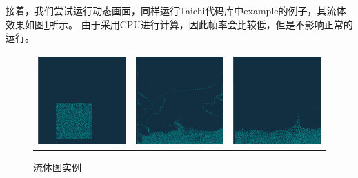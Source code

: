\documentclass[thesis]{thesis}
\begin{document}
接着，我们尝试运行动态画面，同样运行Taichi代码库中example的例子，其流体效果如图\ref{fig:fluid}所示。
由于采用CPU进行计算，因此帧率会比较低，但是不影响正常的运行。
\begin{figure}[!ht]
\centering
\begin{tabular}{ccc}
\includegraphics[width=0.33\linewidth]{fig/mpm1.png}&
\includegraphics[width=0.33\linewidth]{fig/mpm2.png}&
\includegraphics[width=0.33\linewidth]{fig/mpm3.png}
\end{tabular}
\caption{流体图实例\protect\footnotemark}
\label{fig:fluid}
\end{figure}
\end{document}
